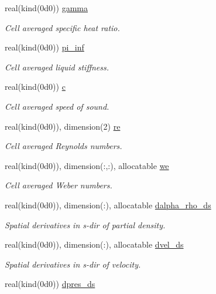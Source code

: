\begin{DoxyCompactItemize}
real(kind(0d0)) \hyperlink{namespacem__cbc_aa657c2e47d8b48e2648c12a454ceec96}{gamma}
\begin{DoxyCompactList}\small\item\em Cell averaged specific heat ratio. \end{DoxyCompactList}\item 
real(kind(0d0)) \hyperlink{namespacem__cbc_a2187e55d648bf7c40be489b5a2b75ca7}{pi\+\_\+inf}
\begin{DoxyCompactList}\small\item\em Cell averaged liquid stiffness. \end{DoxyCompactList}\item 
real(kind(0d0)) \hyperlink{namespacem__cbc_a982b2364cfaa61896b8143231fc9e380}{c}
\begin{DoxyCompactList}\small\item\em Cell averaged speed of sound. \end{DoxyCompactList}\item 
real(kind(0d0)), dimension(2) \hyperlink{namespacem__cbc_af36bd73bae305dd791c6da0a37d2f6f8}{re}
\begin{DoxyCompactList}\small\item\em Cell averaged Reynolds numbers. \end{DoxyCompactList}\item 
real(kind(0d0)), dimension(\+:,\+:), allocatable \hyperlink{namespacem__cbc_a532334846efcbbca82ab11f26e28c5f7}{we}
\begin{DoxyCompactList}\small\item\em Cell averaged Weber numbers. \end{DoxyCompactList}\item 
real(kind(0d0)), dimension(\+:), allocatable \hyperlink{namespacem__cbc_a5d23c9c92bd474ce0a0d5af3c1f37cb8}{dalpha\+\_\+rho\+\_\+ds}
\begin{DoxyCompactList}\small\item\em Spatial derivatives in s-\/dir of partial density. \end{DoxyCompactList}\item 
real(kind(0d0)), dimension(\+:), allocatable \hyperlink{namespacem__cbc_ac2bd4c0c73cfb0582f003473d0ec4f7f}{dvel\+\_\+ds}
\begin{DoxyCompactList}\small\item\em Spatial derivatives in s-\/dir of velocity. \end{DoxyCompactList}\item 
real(kind(0d0)) \hyperlink{namespacem__cbc_ae49b66468d949880db575e26231b641c}{dpres\+\_\+ds}

\end{DoxyCompactItemize}
